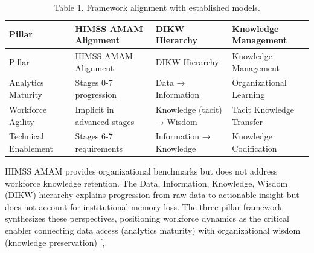 \documentclass[
  american,
  11pt,
  letterpaper,
  oneside  ,captions=tableheading
]{scrartcl}
\begin{document}
\begin{longtable}[]{@{}
  >{\raggedright\arraybackslash}p{}
  >{\raggedright\arraybackslash}p{}
  >{\raggedright\arraybackslash}p{}
  >{\raggedright\arraybackslash}p{}@{}}
\caption{Table 1. Framework alignment with established models.
\label{tab:alignment}}\tabularnewline
\toprule\noalign{}
\begin{minipage}[b]{\linewidth}\raggedright
Pillar
\end{minipage} & \begin{minipage}[b]{\linewidth}\raggedright
HIMSS AMAM Alignment
\end{minipage} & \begin{minipage}[b]{\linewidth}\raggedright
DIKW Hierarchy
\end{minipage} & \begin{minipage}[b]{\linewidth}\raggedright
Knowledge Management
\end{minipage} \\
\midrule\noalign{}
\endfirsthead
\toprule\noalign{}
\begin{minipage}[b]{\linewidth}\raggedright
Pillar
\end{minipage} & \begin{minipage}[b]{\linewidth}\raggedright
HIMSS AMAM Alignment
\end{minipage} & \begin{minipage}[b]{\linewidth}\raggedright
DIKW Hierarchy
\end{minipage} & \begin{minipage}[b]{\linewidth}\raggedright
Knowledge Management
\end{minipage} \\
\midrule\noalign{}
\endhead
\bottomrule\noalign{}
\endlastfoot
Analytics Maturity & Stages 0-7 progression & Data → Information &
Organizational Learning \\
Workforce Agility & Implicit in advanced stages & Knowledge (tacit) →
Wisdom & Tacit Knowledge Transfer \\
Technical Enablement & Stages 6-7 requirements & Information → Knowledge
& Knowledge Codification \\
\end{longtable}

HIMSS AMAM provides organizational benchmarks but does not address
workforce knowledge retention. The Data, Information, Knowledge, Wisdom
(DIKW) hierarchy explains progression from raw data to actionable
insight but does not account for institutional memory loss. The
three-pillar framework synthesizes these perspectives, positioning
workforce dynamics as the critical enabler connecting data access
(analytics maturity) with organizational wisdom (knowledge preservation)
{[},\citeproc{ref-farnese2019}{20}{]}.
\end{document}

